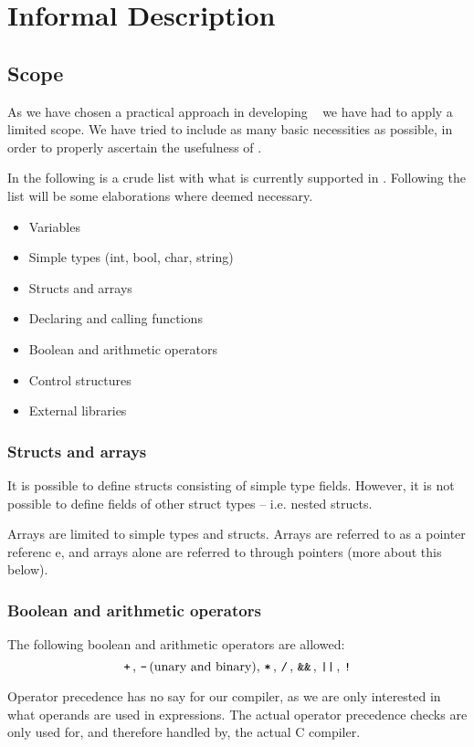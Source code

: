 
\section{Informal Description}

\subsection{Scope}
As we have chosen a practical approach in developing \thelang~ we have had to apply a limited scope.
We have tried to include as many basic necessities as possible, in order to properly ascertain the usefulness of \thelang.

In the following is a crude list with what is currently supported in \thelang.
Following the list will be some elaborations where deemed necessary.
\begin{itemize}
  \item Variables
  \item Simple types (int, bool, char, string)
  \item Structs and arrays
  \item Declaring and calling functions
  \item Boolean and arithmetic operators
  \item Control structures
  \item External libraries
\end{itemize}

\subsubsection{Structs and arrays}
It is possible to define structs consisting of simple type fields.
However, it is not possible to define fields of other struct types -- i.e. nested structs.

Arrays are limited to simple types and structs.
Arrays are referred to as a pointer referenc  e, and arrays alone are referred to through pointers (more about this below).

\subsubsection{Boolean and arithmetic operators}
The following boolean and arithmetic operators are allowed:
\[ \, \texttt{+} \,, \, \texttt{-} \, \text{(unary and binary)}, \, \texttt{*} \,, \, \texttt{/} \,, \, \texttt{\&\&} \,, \, \texttt{||} \,, \, \texttt{!} \, \]

Operator precedence has no say for our compiler, as we are only interested in what operands are used in expressions.
The actual operator precedence checks are only used for, and therefore handled by, the actual C compiler.

